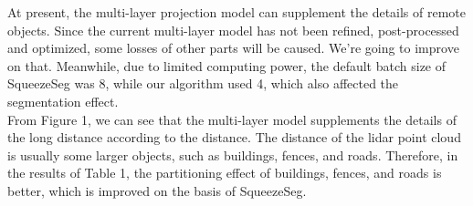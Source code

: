 \documentclass{article}
\begin{document}
\begin{normalsize}
        At present, the multi-layer projection model can supplement the details of remote objects. Since the current multi-layer model has not been refined, post-processed and optimized, some losses of other parts will be caused. We're going to improve on that. Meanwhile, due to limited computing power, the default batch size of SqueezeSeg was 8, while our algorithm used 4, which also affected the segmentation effect.\\
        From Figure 1, we can see that the multi-layer model supplements the details of the long distance according to the distance. The distance of the lidar point cloud is usually some larger objects, such as buildings, fences, and roads.  Therefore, in the results of Table 1, the partitioning effect of buildings, fences, and roads is better, which is improved on the basis of SqueezeSeg.\\
        \begin{figure}[htbp]
        	\centering
        	\quad
        	\quad
\end{figure}
\end{normalsize}
\end{document}
